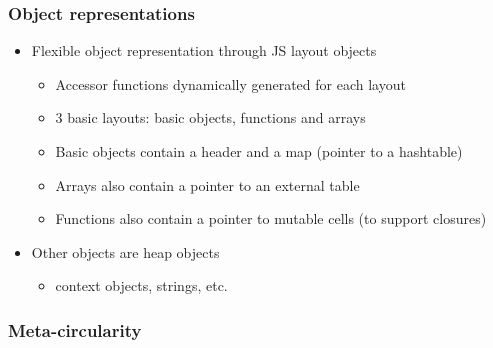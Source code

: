 \begin{frame}
\frametitle{\bf Object representations}

\begin{itemize}
    \item Flexible object representation through JS layout objects
    \begin{itemize}
        \item Accessor functions dynamically generated for each layout
        \item 3 basic layouts: basic objects, functions and arrays
    \end{itemize}
    \begin{itemize}
        \item Basic objects contain a header and a map (pointer to a
        hashtable)
        \item Arrays also contain a pointer to an external table
        \item Functions also contain a pointer to mutable cells (to support
        closures)
    \end{itemize}
    \item Other objects are heap objects
    \begin{itemize}
        \item context objects, strings, etc.
    \end{itemize}
\end{itemize}



\end{frame}

% 

\begin{frame}
\frametitle{\bf Meta-circularity}

\end{frame}

